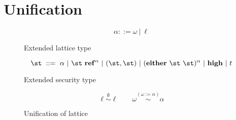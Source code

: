 
\section{Unification}
\label{chap3:unification}

\newcommand{\unify}[1]{\stackrel{{#1}}{\sim}}
\newcommand{\ct}{c^l}

\begin{figure}[t]
\[
\alpha ::= \omega\ |\ \ell
\]
\caption{Extended lattice type}
\label{fig:unif:lt}
\end{figure}

\begin{figure}[t]
\[
\st\ ::=\ \alpha\ |\ \st\ \mathbf{ref}^{\alpha}\ |\ (\st,\st)\ |\ (\mathbf{either}\ \st\ \st)^{\alpha}\ 
        |\ \mathbf{high}\ |\ t
\]
\caption{Extended security type}
\label{fig:unif:st}
\end{figure}

\begin{figure}[t]
\[
\ell\unify{\emptyset} \ell\quad \quad \omega\unify{(\omega:=\alpha)} \alpha
\]
\caption{Unification of lattice}
\label{fig:unif:ul}
\end{figure}


